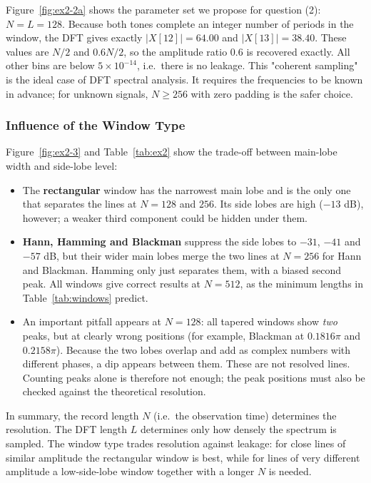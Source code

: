 \documentclass[12pt, a4paper]{article}
\begin{document}
Figure~\ref{fig:ex2-2a} shows the parameter set we propose for question (2): $N=L=128$. Because both tones complete an integer number of periods in the window, the DFT gives exactly $|X[12]|=64.00$ and $|X[13]|=38.40$. These values are $N/2$ and $0.6N/2$, so the amplitude ratio $0.6$ is recovered exactly. All other bins are below $5\times10^{-14}$, i.e.\ there is no leakage. This "coherent sampling" is the ideal case of DFT spectral analysis. It requires the frequencies to be known in advance; for unknown signals, $N\ge256$ with zero padding is the safer choice.

\subsubsection{Influence of the Window Type}
Figure~\ref{fig:ex2-3} and Table~\ref{tab:ex2} show the trade-off between main-lobe width and side-lobe level:
\begin{itemize}
    \item The \textbf{rectangular} window has the narrowest main lobe and is the only one that separates the lines at $N=128$ and $256$. Its side lobes are high ($-13$ dB), however; a weaker third component could be hidden under them.
    \item \textbf{Hann, Hamming and Blackman} suppress the side lobes to $-31$, $-41$ and $-57$ dB, but their wider main lobes merge the two lines at $N=256$ for Hann and Blackman. Hamming only just separates them, with a biased second peak. All windows give correct results at $N=512$, as the minimum lengths in Table~\ref{tab:windows} predict.
    \item An important pitfall appears at $N=128$: all tapered windows show \emph{two} peaks, but at clearly wrong positions (for example, Blackman at $0.1816\pi$ and $0.2158\pi$). Because the two lobes overlap and add as complex numbers with different phases, a dip appears between them. These are not resolved lines. Counting peaks alone is therefore not enough; the peak positions must also be checked against the theoretical resolution.
\end{itemize}

In summary, the record length $N$ (i.e.\ the observation time) determines the resolution. The DFT length $L$ determines only how densely the spectrum is sampled. The window type trades resolution against leakage: for close lines of similar amplitude the rectangular window is best, while for lines of very different amplitude a low-side-lobe window together with a longer $N$ is needed.
\end{document}
